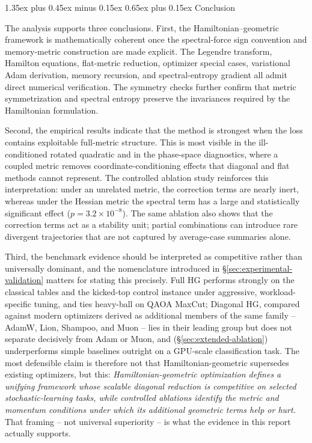 \documentclass[10pt,twocolumn]{article}
\makeatletter
\renewcommand\section{\@startsection{section}{1}{0pt}%
  {1.35ex plus 0.45ex minus 0.15ex}%
  {0.65ex plus 0.15ex}%
  {\large\bfseries}}
\makeatother
\begin{document}
\section{Conclusion}

The analysis supports three conclusions. First, the Hamiltonian--geometric
framework is mathematically coherent once the spectral-force sign convention
and memory-metric construction are made explicit. The Legendre transform,
Hamilton equations, flat-metric reduction, optimizer special cases,
variational Adam derivation, memory recursion, and spectral-entropy gradient
all admit direct numerical verification. The symmetry checks further confirm
that metric symmetrization and spectral entropy preserve the invariances
required by the Hamiltonian formulation.

Second, the empirical results indicate that the method is strongest when the
loss contains exploitable full-metric structure. This is most visible in the
ill-conditioned rotated quadratic and in the phase-space diagnostics, where a
coupled metric removes coordinate-conditioning effects that diagonal and flat
methods cannot represent. The controlled ablation study reinforces this
interpretation: under an unrelated metric, the correction terms are nearly
inert, whereas under the Hessian metric the spectral term has a large and
statistically significant effect ($p=3.2\times10^{-8}$). The same ablation
also shows that the correction terms act as a stability unit; partial
combinations can introduce rare divergent trajectories that are not captured
by average-case summaries alone.

Third, the benchmark evidence should be interpreted as competitive rather
than universally dominant, and the nomenclature introduced in
\S\ref{sec:experimental-validation} matters for stating this precisely.
Full HG performs strongly on the classical tables and the kicked-top control
instance under aggressive, workload-specific tuning, and ties heavy-ball on
QAOA MaxCut; Diagonal HG, compared against modern optimizers derived as
additional members of the same family -- AdamW, Lion, Shampoo, and Muon --
lies in their leading group but does not separate decisively from Adam or
Muon, and (\S\ref{sec:extended-ablation}) underperforms simple baselines
outright on a GPU-scale classification task. The most defensible claim is
therefore not that Hamiltonian-geometric supersedes existing optimizers, but
this: \emph{Hamiltonian-geometric optimization defines a unifying framework
whose scalable diagonal reduction is competitive on selected
stochastic-learning tasks, while controlled ablations identify the metric
and momentum conditions under which its additional geometric terms help or
hurt.} That framing -- not universal superiority -- is what the evidence in
this report actually supports.
\end{document}
